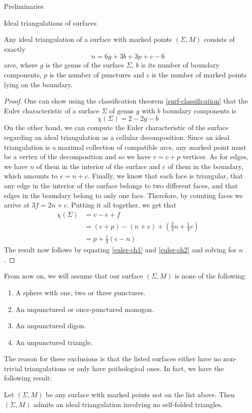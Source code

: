 \begin{chapter}{Preliminaries}
\begin{section}{Ideal triangulations of surfaces}
\begin{prop} Any ideal triangulation of a surface with marked points $(\Sigma, M)$ consists of exactly
\[
n=6g+3b+3p+c-6
\]
arcs, where $g$ is the genus of the surface $\Sigma$, $b$ is its number of boundary components, $p$ is the number of punctures and $c$ is the number of marked points lying on the boundary.
\end{prop}
\begin{proof} One can show using the classification theorem \ref{surf-classification} that the Euler characteristic of a surface $\Sigma$ of genus $g$ with $b$ boundary components is
\begin{equation}\label{euler-ch1}
\chi(\Sigma)=2-2g-b
\end{equation}
On the other hand, we can compute the Euler characteristic of the surface regarding an ideal triangulation as a cellular decomposition. Since an ideal triangulation is a maximal collection of compatible arcs, any marked point must be a vertex of the decomposition and so we have $v = c + p$ vertices. As for edges, we have $n$ of them in the interior of the surface and $c$ of them in the boundary, which amounts to $e = n + c$. Finally, we know that each face is triangular, that any edge in the interior of the surface belongs to two different faces, and that edges in the boundary belong to only one face. Therefore, by counting faces we arrive at $3f = 2n+c$. Putting it all together, we get that
\[
\begin{aligned}\label{euler-ch2}
\chi(\Sigma)&=v-e+f\\
&=(c+p)-(n+c)+\left(\frac{2}{3}n+\frac{1}{3} c\right)\\
&=p+\frac{1}{3}(c-n)
\end{aligned}
\]
The result now follows by equating \eqref{euler-ch1} and \eqref{euler-ch2} and solving for $n$.
\end{proof}

From now on, we will assume that our surface $(\Sigma, M)$ is none of the following:
\begin{enumerate}
\item A sphere with one, two or three punctures.
\item An unpunctured or once-punctured monogon.
\item An unpunctured digon.
\item An unpunctured triangle.
\end{enumerate}
The reason for these exclusions is that the listed surfaces either have no non-trivial triangulations or only have pathological ones. In fact, we have the following result:

\begin{prop} Let $(\Sigma, M)$ be any surface with marked points not on the list above. Then $(\Sigma, M)$ admits an ideal triangulation involving no self-folded triangles. \hfill\qedsymbol
\end{prop}
\end{section}
\end{chapter}